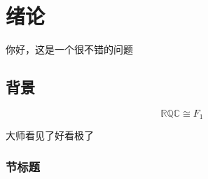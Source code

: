 \cleardoublepage

\section{绪论}
你好，这是一个很不错的问题
\subsection{背景}

\begin{equation}
\mathbb{RQC}\cong F_1
\end{equation}

大师看见了好看极了\cite{liu_coupled_2020}
\subsubsection{节标题}
